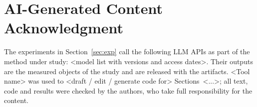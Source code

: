 \section*{AI-Generated Content Acknowledgment}
The experiments in Section~\ref{sec:exp} call the following LLM APIs as part of the method under study:
<model list with versions and access dates>. Their outputs are the measured objects of the study and are released
with the artifacts. <Tool name> was used to <draft / edit / generate code for> Sections~<...>; all text, code and
results were checked by the authors, who take full responsibility for the content.

